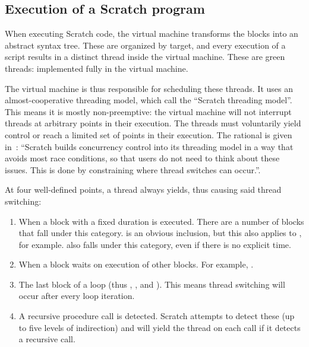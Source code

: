 \documentclass[../main]{subfiles}
\begin{document}
\subsection{Execution of a Scratch program}\label{subsec:execution-of-a-scratch-program}

When executing Scratch code, the virtual machine transforms the blocks into an abstract syntax tree.
These are organized by target, and every execution of a script results in a distinct thread inside the virtual machine.
These are green threads: implemented fully in the virtual machine.

The virtual machine is thus responsible for scheduling these threads.
It uses an almost-cooperative threading model, which \textcite{maloneyScratchProgrammingLanguage2010} call the ``Scratch threading model''.
This means it is mostly non-preemptive: the virtual machine will not interrupt threads at arbitrary points in their execution.
The threads must voluntarily yield control or reach a limited set of points in their execution.
The rational is given in~\cite{maloneyScratchProgrammingLanguage2010}: ``Scratch builds concurrency control into its threading model in a way that avoids most race conditions, so that users do not need to think about these issues.
This is done by constraining where thread switches can occur.''.

At four well-defined points, a thread always yields, thus causing said thread switching:
\begin{enumerate}
    \item When a block with a fixed duration is executed.
        There are a number of blocks that fall under this category.
         is an obvious inclusion, but this also applies to , for example.
         also falls under this category, even if there is no explicit time.
    \item When a block waits on execution of other blocks.
        For example, .
    \item The last block of a loop (thus , , and ).
        This means thread switching will occur after every loop iteration.
    \item A recursive procedure call is detected.
        Scratch attempts to detect these (up to five levels of indirection) and will yield the thread on each call if it detects a recursive call.
\end{enumerate}
\end{document}
